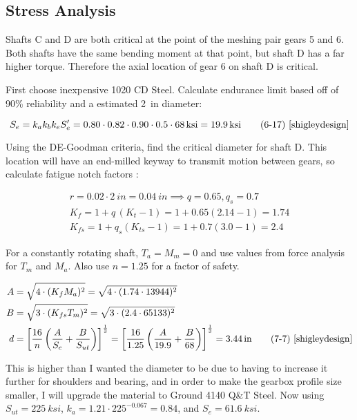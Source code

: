 \documentclass[titlepage]{article} %
\begin{document}
\subsection{Stress Analysis}
Shafts C and D are both critical at the point of the meshing pair gears 5 and 6.
Both shafts have the same bending moment at that point, but shaft D has a far
higher torque. Therefore the axial location of gear 6 on shaft D is critical. 

First choose inexpensive 1020 CD Steel. Calculate endurance limit based off of
90\% reliability and a estimated \SI{2}{in} diameter:

\begin{equation*}
    S_e = k_a k_b k_e S_e' = 0.80 \cdot 0.82 \cdot 0.90 \cdot 0.5 \cdot \SI{68}{ksi} = \SI{19.9}{ksi}  \tag*{(6-17) \cite{shigleydesign}}
\end{equation*}

Using the DE-Goodman criteria, find the critical diameter for shaft D. This
location will have an end-milled keyway to transmit motion between gears, so
calculate fatigue notch factors \cite{shigleydesign}:

\begin{gather*} 
    r = 0.02 \cdot \SI{2}{in} = \SI{0.04}{in} \implies q = 0.65, q_s = 0.7 \\
    K_f = 1 + q\,(K_t - 1) = 1 + 0.65(2.14-1) = 1.74 \\
    K_{fs} = 1 + q_s(K_{ts} - 1) = 1 + 0.7(3.0-1) = 2.4
\end{gather*}
 
For a constantly rotating shaft, $T_a = M_m = 0$ and use values from force
analysis for $T_m$ and $M_a$. Also use $n=1.25$ for a factor of safety.

\begin{align*}
    A &= \sqrt{4 \cdot (K_f M_a)^2} = \sqrt{4 \cdot (1.74 \cdot 13944)^2} \\
    B &= \sqrt{3 \cdot (K_{fs} T_m)^2} = \sqrt{3 \cdot (2.4 \cdot 65133)^2}\\
    d & = \left[\frac{16}{n}\left(\frac{A}{S_e}+\frac{B}{S_{ut}}\right)\right]^{\frac{1}{3}} = \left[\frac{16}{1.25}\left(\frac{A}{19.9}+\frac{B}{68}\right)\right]^{\frac{1}{3}} = \SI{3.44}{in} \tag*{(7-7) \cite{shigleydesign}}
\end{align*}

This is higher than I wanted the diameter to be due to having to increase it
further for shoulders and bearing, and in order to make the gearbox profile size
smaller, I will upgrade the material to Ground 4140 Q\&T Steel. Now using $S_{ut}
= \SI{225}{ksi}$, $k_a =  1.21 \cdot 225^{-0.067} = 0.84$, and $S_e =
\SI{61.6}{ksi}$.
\end{document}
